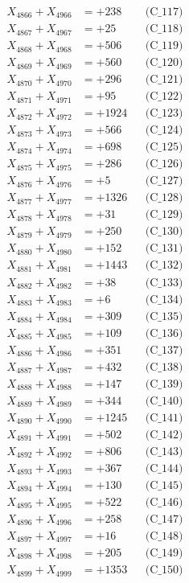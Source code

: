 \documentclass[a4paper,10pt]{article}
\begin{document}
{\begin{align}
X_{4866} + X_{4966} &= +238 && \text{(C\_117)} \\
X_{4867} + X_{4967} &= +25 && \text{(C\_118)} \\
X_{4868} + X_{4968} &= +506 && \text{(C\_119)} \\
X_{4869} + X_{4969} &= +560 && \text{(C\_120)} \\
\allowbreak
X_{4870} + X_{4970} &= +296 && \text{(C\_121)} \\
X_{4871} + X_{4971} &= +95 && \text{(C\_122)} \\
X_{4872} + X_{4972} &= +1924 && \text{(C\_123)} \\
X_{4873} + X_{4973} &= +566 && \text{(C\_124)} \\
X_{4874} + X_{4974} &= +698 && \text{(C\_125)} \\
\allowbreak
X_{4875} + X_{4975} &= +286 && \text{(C\_126)} \\
X_{4876} + X_{4976} &= +5 && \text{(C\_127)} \\
X_{4877} + X_{4977} &= +1326 && \text{(C\_128)} \\
X_{4878} + X_{4978} &= +31 && \text{(C\_129)} \\
X_{4879} + X_{4979} &= +250 && \text{(C\_130)} \\
\allowbreak
X_{4880} + X_{4980} &= +152 && \text{(C\_131)} \\
X_{4881} + X_{4981} &= +1443 && \text{(C\_132)} \\
X_{4882} + X_{4982} &= +38 && \text{(C\_133)} \\
X_{4883} + X_{4983} &= +6 && \text{(C\_134)} \\
X_{4884} + X_{4984} &= +309 && \text{(C\_135)} \\
\allowbreak
X_{4885} + X_{4985} &= +109 && \text{(C\_136)} \\
X_{4886} + X_{4986} &= +351 && \text{(C\_137)} \\
X_{4887} + X_{4987} &= +432 && \text{(C\_138)} \\
X_{4888} + X_{4988} &= +147 && \text{(C\_139)} \\
X_{4889} + X_{4989} &= +344 && \text{(C\_140)} \\
\allowbreak
X_{4890} + X_{4990} &= +1245 && \text{(C\_141)} \\
X_{4891} + X_{4991} &= +502 && \text{(C\_142)} \\
X_{4892} + X_{4992} &= +806 && \text{(C\_143)} \\
X_{4893} + X_{4993} &= +367 && \text{(C\_144)} \\
X_{4894} + X_{4994} &= +130 && \text{(C\_145)} \\
\allowbreak
X_{4895} + X_{4995} &= +522 && \text{(C\_146)} \\
X_{4896} + X_{4996} &= +258 && \text{(C\_147)} \\
X_{4897} + X_{4997} &= +16 && \text{(C\_148)} \\
X_{4898} + X_{4998} &= +205 && \text{(C\_149)} \\
X_{4899} + X_{4999} &= +1353 && \text{(C\_150)} \\
\end{align}
}
\end{document}
